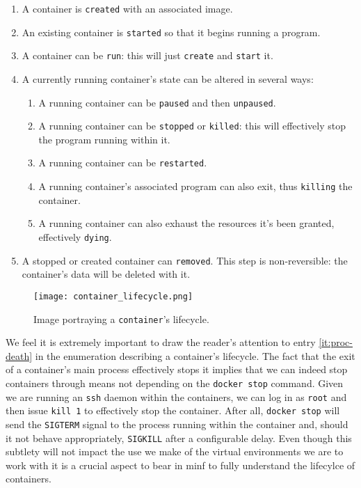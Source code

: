                 \begin{enumerate}
                    \item A container is \texttt{created} with an associated image.
                    \item An existing container is \texttt{started} so that it begins running a program.
                    \item A container can be \texttt{run}: this will just \texttt{create} and \texttt{start} it.
                    \item A currently running container's state can be altered in several ways:
                    \begin{enumerate}
                        \item A running container can be \texttt{paused} and then \texttt{unpaused}.
                        \item A running container can be \texttt{stopped} or \texttt{killed}: this will effectively stop the program running within it.
                        \item A running container can be \texttt{restarted}.
                        \item A running container's associated program can also exit, thus \texttt{killing} the container. \label{it:proc-death}
                        \item A running container can also exhaust the resources it's been granted, effectively \texttt{dying}.
                    \end{enumerate}
                    \item A stopped or created container can \texttt{removed}. This step is non-reversible: the container's data will be deleted with it.
                \end{enumerate}

                \begin{sidewaysfigure}
                    \centering
                    \texttt{[image: container\_lifecycle.png]}
                    \caption[Container Lifecycle]{Image portraying a \texttt{container}'s lifecycle. \cite{bib:container-lifecycle}}
                    \label{fig:container-lifecycle}
                \end{sidewaysfigure}

                We feel it is extremely important to draw the reader's attention to entry \ref{it:proc-death} in the enumeration describing a container's lifecycle. The fact that the exit of a container's main process effectively stops it implies that we can indeed stop containers through means not depending on the \texttt{docker stop} command. Given we are running an \texttt{ssh} daemon within the containers, we can log in as \texttt{root} and then issue \texttt{kill 1} to effectively stop the container. After all, \texttt{docker stop} will send the \texttt{SIGTERM} signal to the process running within the container and, should it not behave appropriately, \texttt{SIGKILL} after a configurable delay. Even though this subtlety will not impact the use we make of the virtual environments we are to work with it is a crucial aspect to bear in minf to fully understand the lifecylce of containers.\\

